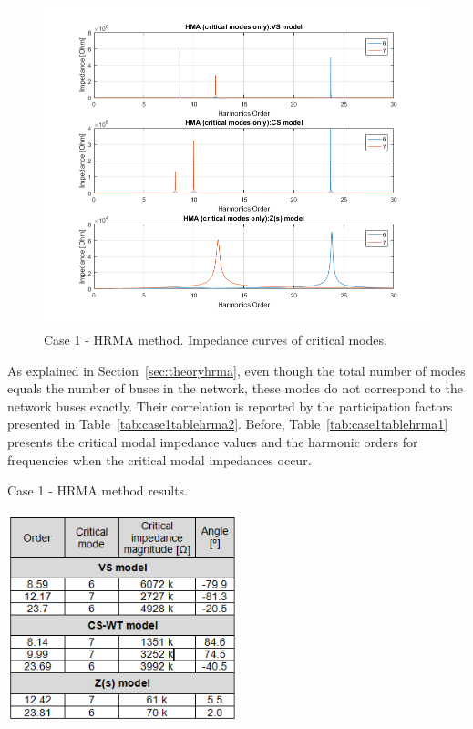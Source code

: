 \documentclass[12pt]{report} %
\begin{document}
\begin{figure}[htb]
	\centering
	\includegraphics[width=1\textwidth]{img/Case1/Case1_HMA_crit.png}
  	\caption{Case 1 - HRMA method. Impedance curves of critical modes.}
  	\label{fig:case1hrma3}
\end{figure}
\FloatBarrier

As explained in Section~\ref{sec:theoryhrma}, even though the total number of modes equals the number of buses in the network, these modes do not correspond to the network buses exactly. Their correlation is reported by the participation factors presented in Table~\ref{tab:case1tablehrma2}. Before, Table~\ref{tab:case1tablehrma1} presents the critical modal impedance values and the harmonic orders for frequencies when the critical modal impedances occur.

\begin{table}[htb]
	\centering
	\caption{Case 1 - HRMA method results.}
	\label{tab:case1tablehrma1}
	\includegraphics[width=0.5\textwidth]{img/Case1/table_HRMA1.png}
\end{table}
\FloatBarrier
\end{document}
